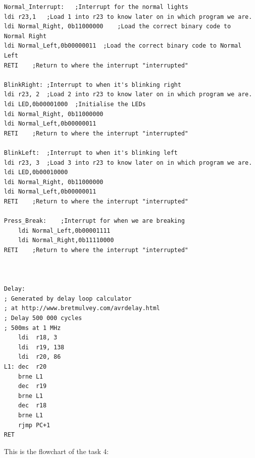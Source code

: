 \documentclass[a4paper,12pt]{article}
\begin{document}
\begin{lstlisting}
Normal_Interrupt:	;Interrupt for the normal lights
ldi r23,1	;Load 1 into r23 to know later on in which program we are.
ldi Normal_Right, 0b11000000	;Load the correct binary code to Normal Right
ldi Normal_Left,0b00000011	;Load the correct binary code to Normal Left
RETI	;Return to where the interrupt "interrupted"

BlinkRight:	;Interrupt to when it's blinking right
ldi r23, 2	;Load 2 into r23 to know later on in which program we are.
ldi LED,0b00001000	;Initialise the LEDs
ldi Normal_Right, 0b11000000
ldi Normal_Left,0b00000011
RETI	;Return to where the interrupt "interrupted"

BlinkLeft:	;Interrupt to when it's blinking left
ldi r23, 3	;Load 3 into r23 to know later on in which program we are.
ldi LED,0b00010000
ldi Normal_Right, 0b11000000
ldi Normal_Left,0b00000011
RETI	;Return to where the interrupt "interrupted"
	
Press_Break:	;Interrupt for when we are breaking
	ldi Normal_Left,0b00001111
	ldi Normal_Right,0b11110000
RETI	;Return to where the interrupt "interrupted"
		


Delay:
; Generated by delay loop calculator
; at http://www.bretmulvey.com/avrdelay.html
; Delay 500 000 cycles
; 500ms at 1 MHz
    ldi  r18, 3
    ldi  r19, 138
    ldi  r20, 86
L1: dec  r20
    brne L1
    dec  r19
    brne L1
    dec  r18
    brne L1
    rjmp PC+1
RET
\end{lstlisting}

\newpage
This is the flowchart of the task 4:
\begin{center}
\end{center}


\end{document}
